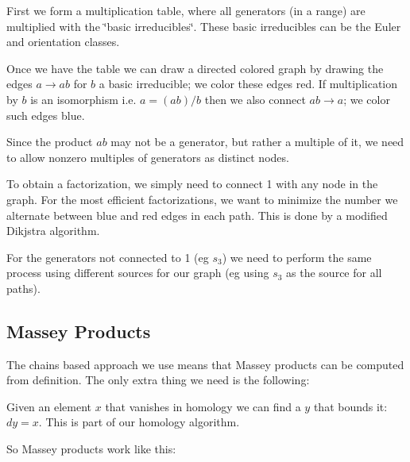 \begin{DoxyItemize}
\item First we form a multiplication table, where all generators (in a range) are multiplied with the \char`\"{}basic irreducibles\char`\"{}. These basic irreducibles can be the Euler and orientation classes.
\item Once we have the table we can draw a directed colored graph by drawing the edges $a\to ab$ for $b$ a basic irreducible; we color these edges red. If multiplication by $b$ is an isomorphism i.\+e. $a=(ab)/b$ then we also connect $ab\to a$; we color such edges blue.
\item Since the product $ab$ may not be a generator, but rather a multiple of it, we need to allow nonzero multiples of generators as distinct nodes.
\item To obtain a factorization, we simply need to connect 1 with any node in the graph. For the most efficient factorizations, we want to minimize the number we alternate between blue and red edges in each path. This is done by a modified Dikjstra algorithm.
\item For the generators not connected to 1 (eg $s_3$) we need to perform the same process using different sources for our graph (eg using $s_3$ as the source for all paths).
\end{DoxyItemize}\hypertarget{math_Mass}{}\subsection{Massey Products}\label{math_Mass}
The chains based approach we use means that Massey products can be computed from definition. The only extra thing we need is the following\+:


\begin{DoxyItemize}
\item Given an element $x$ that vanishes in homology we can find a $y$ that bounds it\+: $dy=x$. This is part of our homology algorithm.
\end{DoxyItemize}

So Massey products work like this\+:


